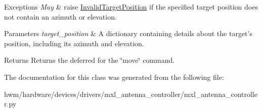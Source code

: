 \begin{DoxyExceptions}{Exceptions}
{\em May} & raise \hyperlink{classhwm_1_1hardware_1_1devices_1_1drivers_1_1mxl__antenna__controller_1_1mxl__antenna__controller_1_1_invalid_target_position}{Invalid\-Target\-Position} if the specified target position does not contain an azimuth or elevation.\\
\hline
\end{DoxyExceptions}

\begin{DoxyParams}{Parameters}
{\em target\-\_\-position} & A dictionary containing details about the target's position, including its azimuth and elevation. \\
\hline
\end{DoxyParams}
\begin{DoxyReturn}{Returns}
Returns the deferred for the \char`\"{}move\char`\"{} command. 
\end{DoxyReturn}


The documentation for this class was generated from the following file\-:\begin{DoxyCompactItemize}
\item 
hwm/hardware/devices/drivers/mxl\-\_\-antenna\-\_\-controller/mxl\-\_\-antenna\-\_\-controller.\-py\end{DoxyCompactItemize}
